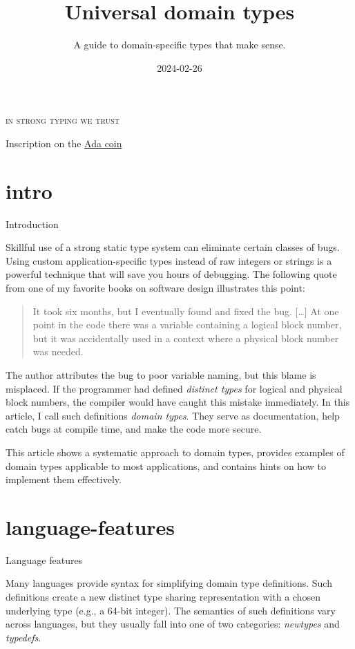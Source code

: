 \documentclass{article}
\title{Universal domain types}
\subtitle{A guide to domain-specific types that make sense.}
\date{2024-02-26}
\begin{document}
\epigraph{
  \textsc{in strong typing we trust}
}{Inscription on the \href{https://people.cs.kuleuven.be/~dirk.craeynest/ada-belgium/pictures/ada-strong.html}{Ada coin}}

\section{intro}{Introduction}

Skillful use of a strong static type system can eliminate certain classes of bugs.
Using custom application-specific types instead of raw integers or strings is a powerful technique that will save you hours of debugging.
The following quote from one of my favorite books on software design illustrates this point:

\blockquote{
  It took six months, but I eventually found and fixed the bug. [\ldots]
  At one point in the code there was a  variable containing a logical block number, but it was accidentally used in a context where a physical block number was needed.
}{}

The author attributes the bug to poor variable naming, but this blame is misplaced.
If the programmer had defined \emph{distinct types} for logical and physical block numbers, the compiler would have caught this mistake immediately.
In this article, I call such definitions \emph{domain types}.
They serve as documentation, help catch bugs at compile time, and make the code more secure.

This article shows a systematic approach to domain types, provides examples of domain types applicable to most applications, and contains hints on how to implement them effectively.

\section{language-features}{Language features}

Many languages provide syntax for simplifying domain type definitions.
Such definitions create a new distinct type sharing representation with a chosen underlying type (e.g., a 64-bit integer).
The semantics of such definitions vary across languages, but they usually fall into one of two categories: \emph{newtypes} and \emph{typedefs}.
\end{document}
